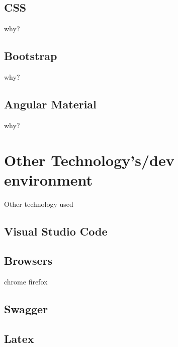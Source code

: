 \subsection{CSS}
why?
\subsection{Bootstrap}
why?
\subsection{Angular Material}
why?

\section{Other Technology's/dev environment}
Other technology used
\subsection{Visual Studio Code}
\subsection{Browsers}
chrome firefox
\subsection{Swagger}
\subsection{Latex}



